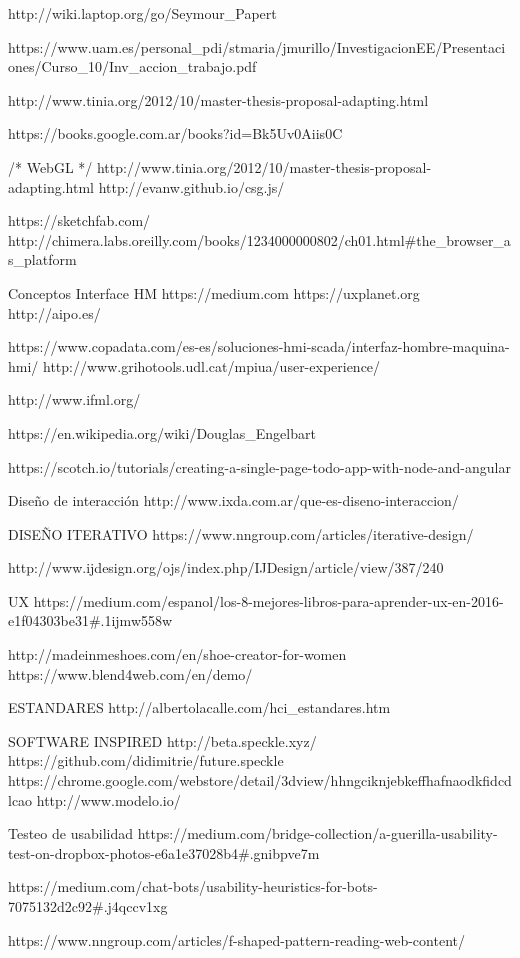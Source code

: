 http://wiki.laptop.org/go/Seymour_Papert

https://www.uam.es/personal_pdi/stmaria/jmurillo/InvestigacionEE/Presentaciones/Curso_10/Inv_accion_trabajo.pdf

http://www.tinia.org/2012/10/master-thesis-proposal-adapting.html

https://books.google.com.ar/books?id=Bk5Uv0Aiis0C

/* WebGL */
http://www.tinia.org/2012/10/master-thesis-proposal-adapting.html
http://evanw.github.io/csg.js/

https://sketchfab.com/
http://chimera.labs.oreilly.com/books/1234000000802/ch01.html#the_browser_as_platform

Conceptos Interface HM
https://medium.com
https://uxplanet.org
http://aipo.es/

https://www.copadata.com/es-es/soluciones-hmi-scada/interfaz-hombre-maquina-hmi/
http://www.grihotools.udl.cat/mpiua/user-experience/

http://www.ifml.org/

https://en.wikipedia.org/wiki/Douglas_Engelbart

https://scotch.io/tutorials/creating-a-single-page-todo-app-with-node-and-angular

Diseño de interacción
http://www.ixda.com.ar/que-es-diseno-interaccion/

DISEÑO ITERATIVO
https://www.nngroup.com/articles/iterative-design/

http://www.ijdesign.org/ojs/index.php/IJDesign/article/view/387/240

UX
https://medium.com/espanol/los-8-mejores-libros-para-aprender-ux-en-2016-e1f04303be31#.1ijmw558w

http://madeinmeshoes.com/en/shoe-creator-for-women
https://www.blend4web.com/en/demo/


ESTANDARES
http://albertolacalle.com/hci_estandares.htm

SOFTWARE INSPIRED
http://beta.speckle.xyz/
https://github.com/didimitrie/future.speckle
https://chrome.google.com/webstore/detail/3dview/hhngciknjebkeffhafnaodkfidcdlcao
http://www.modelo.io/


Testeo de usabilidad
https://medium.com/bridge-collection/a-guerilla-usability-test-on-dropbox-photos-e6a1e37028b4#.gnibpve7m

https://medium.com/chat-bots/usability-heuristics-for-bots-7075132d2c92#.j4qccv1xg

https://www.nngroup.com/articles/f-shaped-pattern-reading-web-content/

